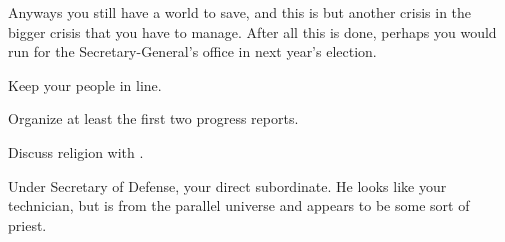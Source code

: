 \documentclass[char]{guildcamp3}
\begin{document}
Anyways you still have a world to save, and this is but another crisis in the bigger crisis that you have to manage. After all this is done, perhaps you would run for the Secretary-General's office in next year's election.

\begin{itemz}[Goals]
  \item Keep your people in line.
  \item Organize at least the first two progress reports.
  \item Discuss religion with \cPaladin{}.
\end{itemz}

\begin{contacts}
  \contact{\cPoliOne{}} Under Secretary of Defense, your direct subordinate.
  \contact{\cPaladin{}} He looks like your technician, but is from the parallel universe and appears to be some sort of priest.
\end{contacts}
\end{document}
